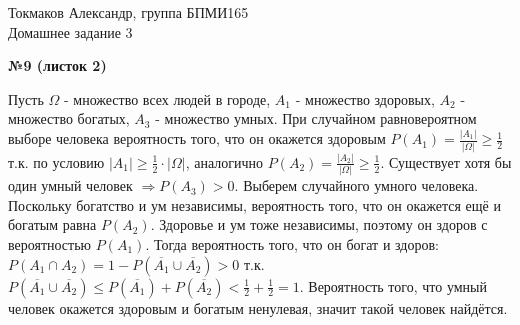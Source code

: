 \documentclass{article}
\newenvironment{task}{\begin{center}\fontsize{14}{14}\selectfont\bf}{\rm\fontsize{12}{12}\selectfont\end{center}}
\begin{document}
	\begin{center}
		Токмаков Александр, группа БПМИ165 \\
		Домашнее задание 3
	\end{center}
	
	\begin{task} 
		№9 (листок 2)
	\end{task}
	Пусть $\Omega$ - множество всех людей в городе, $A_1$ - множество здоровых, $A_2$ - множество богатых, $A_3$ - множество умных. При случайном равновероятном выборе человека вероятность того, что он окажется здоровым $P(A_1) = \frac{|A_1|}{|\Omega|} \geq \frac{1}{2}$ т.к. по условию $|A_1| \geq \frac{1}{2}\cdot |\Omega|$, аналогично  $P(A_2) = \frac{|A_2|}{|\Omega|} \geq \frac{1}{2}$. Существует хотя бы один умный человек $\Rightarrow P(A_3) > 0$. Выберем случайного умного человека. Поскольку богатство и ум независимы, вероятность того, что он окажется ещё и богатым равна $P(A_2)$. Здоровье и ум тоже независимы, поэтому он здоров с вероятностью $P(A_1)$. Тогда вероятность того, что он богат и здоров: $P(A_1 \cap A_2) = 1 - P(\overline{A_1} \cup \overline{A_2}) > 0$ т.к. $P(\overline{A_1} \cup \overline{A_2}) \leq P(\overline{A_1}) + P(\overline{A_2}) < \frac{1}{2} + \frac{1}{2} = 1$. Вероятность того, что умный человек окажется здоровым и богатым ненулевая, значит такой человек найдётся.
	
\end{document}
